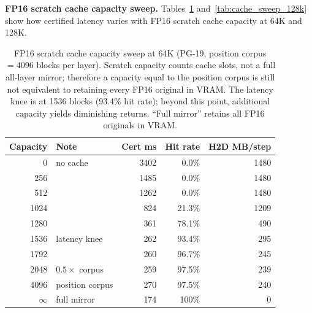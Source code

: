 \documentclass[11pt,a4paper]{article}
\theoremstyle{definition}
\theoremstyle{remark}
\begin{document}
\textbf{FP16 scratch cache capacity sweep.}  Tables~\ref{tab:cache_sweep_64k} and~\ref{tab:cache_sweep_128k} show how certified latency varies with FP16 scratch cache capacity at 64K and 128K.

\begin{table}[H]
\centering
\caption{FP16 scratch cache capacity sweep at 64K (PG-19, position corpus${}=4096$ blocks per layer).  Scratch capacity counts cache slots, not a full all-layer mirror; therefore a capacity equal to the position corpus is still not equivalent to retaining every FP16 original in VRAM\@.  The latency knee is at 1536 blocks (93.4\% hit rate); beyond this point, additional capacity yields diminishing returns.  ``Full mirror'' retains all FP16 originals in VRAM\@.}
\label{tab:cache_sweep_64k}
\small
\begin{tabular}{rlrrr}
\toprule
\textbf{Capacity} & \textbf{Note} & \textbf{Cert ms} & \textbf{Hit rate} & \textbf{H2D MB/step} \\
\midrule
0       & no cache       & 3402 & 0.0\%   & 1480 \\
256     &                & 1485 & 0.0\%   & 1480 \\
512     &                & 1262 & 0.0\%   & 1480 \\
1024    &                & 824  & 21.3\%  & 1209 \\
1280    &                & 361  & 78.1\%  & 490 \\
\rowcolor[gray]{0.92}
1536    & latency knee   & 262  & 93.4\%  & 295 \\
1792    &                & 260  & 96.7\%  & 245 \\
2048    & $0.5\times$ corpus & 259 & 97.5\% & 239 \\
4096    & position corpus & 270 & 97.5\% & 240 \\
\rowcolor[gray]{0.92}
$\infty$ & full mirror  & 174  & 100\%   & 0 \\
\bottomrule
\end{tabular}
\end{table}
\end{document}
